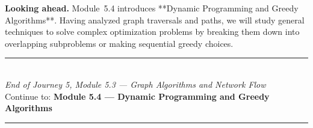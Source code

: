 \documentclass[12pt, a4paper]{book}
\begin{document}
\medskip
\noindent\textbf{Looking ahead.}
Module~5.4 introduces **Dynamic Programming and Greedy Algorithms**. Having analyzed graph traversals and paths, we will study general techniques to solve complex optimization problems by breaking them down into overlapping subproblems or making sequential greedy choices.

\vspace{1.4cm}
\begin{center}
{\color{JourneyColor}\rule{0.5\linewidth}{0.8pt}}\\[6pt]
{\small\color{JourneyColor}\textit{End of Journey 5, Module 5.3 --- Graph Algorithms and Network Flow}}\\[4pt]
{\small\color{JourneyColor}Continue to: \textbf{Module 5.4 --- Dynamic Programming and Greedy Algorithms}}\\[6pt]
{\color{JourneyColor}\rule{0.5\linewidth}{0.8pt}}
\end{center}
\end{document}
